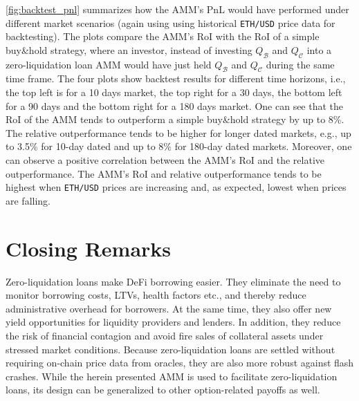 \documentclass[a4paper]{article}
\begin{document}
\cref{fig:backtest_pnl} summarizes how the AMM's PnL would have performed under different market scenarios (again using using historical \verb|ETH/USD| price data for backtesting). The plots compare the AMM's RoI with the RoI of a simple buy\&hold strategy, where an investor, instead of investing $Q_\mathcal{B}$ and $Q_\mathcal{C}$ into a zero-liquidation loan AMM would have just held $Q_\mathcal{B}$ and $Q_\mathcal{C}$ during the same time frame. The four plots show backtest results for different time horizons, i.e., the top left is for a 10 days market, the top right for a 30 days, the bottom left for a 90 days and the bottom right for a 180 days market. One can see that the RoI of the AMM tends to outperform a simple buy\&hold strategy by up to 8\%. The relative outperformance tends to be higher for longer dated markets, e.g., up to 3.5\% for 10-day dated and up to 8\% for 180-day dated markets. Moreover, one can observe a positive correlation between the AMM's RoI and the relative outperformance. The AMM's RoI and relative outperformance tends to be highest when \verb|ETH/USD| prices are increasing and, as expected, lowest when prices are falling.

\section{Closing Remarks}
Zero-liquidation loans make DeFi borrowing easier. They eliminate the need to monitor borrowing costs, LTVs, health factors etc., and thereby reduce administrative overhead for borrowers. At the same time, they also offer new yield opportunities for liquidity providers and lenders. In addition, they reduce the risk of financial contagion and avoid fire sales of collateral assets under stressed market conditions. Because zero-liquidation loans are settled without requiring on-chain price data from oracles, they are also more robust against flash crashes. While the herein presented AMM is used to facilitate zero-liquidation loans, its design can be generalized to other option-related payoffs as well. %

\newpage


\end{document}
